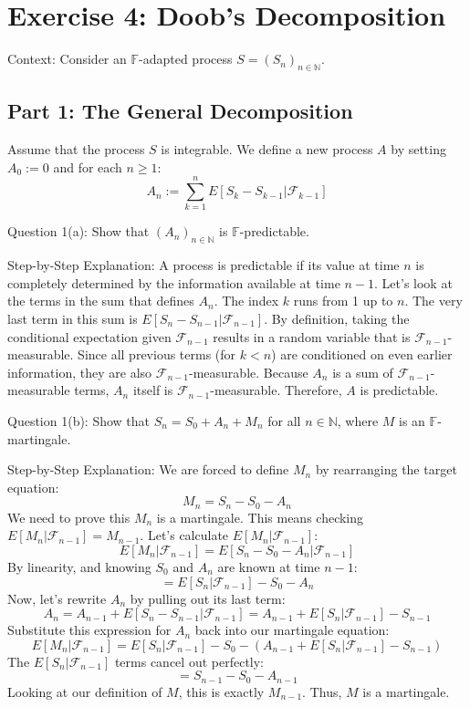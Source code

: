 \section{Exercise 4: Doob's Decomposition}

Context: Consider an $\mathbb{F}$-adapted process $S = (S_n)_{n\in\mathbb{N}}$.

\subsection{Part 1: The General Decomposition}

Assume that the process $S$ is integrable. We define a new process $A$ by setting $A_0 := 0$ and for each $n \ge 1$:
\[ A_n := \sum_{k=1}^n E[S_k - S_{k-1} | \mathcal{F}_{k-1}] \]

Question 1(a): Show that $(A_n)_{n\in\mathbb{N}}$ is $\mathbb{F}$-predictable.

Step-by-Step Explanation:
A process is predictable if its value at time $n$ is completely determined by the information available at time $n-1$. Let's look at the terms in the sum that defines $A_n$.
The index $k$ runs from 1 up to $n$. The very last term in this sum is $E[S_n - S_{n-1} | \mathcal{F}_{n-1}]$.
By definition, taking the conditional expectation given $\mathcal{F}_{n-1}$ results in a random variable that is $\mathcal{F}_{n-1}$-measurable. Since all previous terms (for $k < n$) are conditioned on even earlier information, they are also $\mathcal{F}_{n-1}$-measurable. 
Because $A_n$ is a sum of $\mathcal{F}_{n-1}$-measurable terms, $A_n$ itself is $\mathcal{F}_{n-1}$-measurable. Therefore, $A$ is predictable.

Question 1(b): Show that $S_n = S_0 + A_n + M_n$ for all $n \in \mathbb{N}$, where $M$ is an $\mathbb{F}$-martingale.

Step-by-Step Explanation:
We are forced to define $M_n$ by rearranging the target equation:
\[ M_n = S_n - S_0 - A_n \]
We need to prove this $M_n$ is a martingale. This means checking $E[M_n | \mathcal{F}_{n-1}] = M_{n-1}$. Let's calculate $E[M_n | \mathcal{F}_{n-1}]$:
\[ E[M_n | \mathcal{F}_{n-1}] = E[S_n - S_0 - A_n | \mathcal{F}_{n-1}] \]
By linearity, and knowing $S_0$ and $A_n$ are known at time $n-1$:
\[ = E[S_n | \mathcal{F}_{n-1}] - S_0 - A_n \]
Now, let's rewrite $A_n$ by pulling out its last term:
\[ A_n = A_{n-1} + E[S_n - S_{n-1} | \mathcal{F}_{n-1}] = A_{n-1} + E[S_n | \mathcal{F}_{n-1}] - S_{n-1} \]
Substitute this expression for $A_n$ back into our martingale equation:
\[ E[M_n | \mathcal{F}_{n-1}] = E[S_n | \mathcal{F}_{n-1}] - S_0 - (A_{n-1} + E[S_n | \mathcal{F}_{n-1}] - S_{n-1}) \]
The $E[S_n | \mathcal{F}_{n-1}]$ terms cancel out perfectly:
\[ = S_{n-1} - S_0 - A_{n-1} \]
Looking at our definition of $M$, this is exactly $M_{n-1}$. Thus, $M$ is a martingale.

